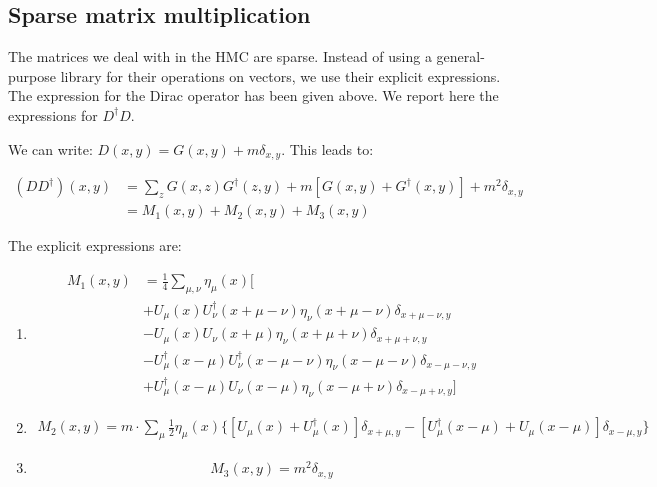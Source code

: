 \documentclass[12pt, a4paper]{article}
\begin{document}
  

\subsection{Sparse matrix multiplication}

The matrices we deal with in the HMC are sparse. 
Instead of using a general-purpose library for their operations on vectors, 
we use their explicit expressions. 
The expression for the Dirac operator has been given above. 
We report here the expressions for $D^{\dagger} D$.

We can write: $D(x,y) = G(x,y) + m \delta_{x,y}$. 
This leads to:

\begin{equation}
\begin{aligned}
(D D^{\dagger}) (x,y) 
&= 
\sum_{z} G(x,z) G^{\dagger}(z,y)
+ m [ G(x,y) + G^{\dagger}(x,y) ]
+ m^2 \delta_{x,y} 
\\
&= M_1(x,y) + M_2(x,y) + M_3(x,y)
\end{aligned}
\end{equation}

The explicit expressions are:

\begin{enumerate}
\item
\begin{equation}
\begin{aligned}
  M_1(x,y)
  &= 
  \frac{1}{4} \sum_{\mu, \nu} \eta_\mu(x)
  [ 
\\
  &+ U_\mu(x) U^{\dagger}_\nu(x+\mu-\nu) 
  \eta_{\nu}(x+\mu-\nu) \delta_{x+\mu-\nu, y}
   \\
  &- U_{\mu}(x) U_{\nu}(x+\mu) 
  \eta_{\nu}(x+\mu+\nu) \delta_{x+\mu+\nu,y}
  \\
  &- U^{\dagger}_{\mu}(x-\mu) U^{\dagger}_{\nu}(x-\mu-\nu) 
  \eta_{\nu}(x-\mu-\nu) \delta_{x-\mu-\nu,y}
   \\
  &+ U^{\dagger}_{\mu}(x-\mu) U_{\nu}(x-\mu) 
  \eta_{\nu}(x-\mu+\nu) \delta_{x-\mu+\nu,y}
  ]
\end{aligned}
\end{equation}

\item
\begin{equation}
\begin{aligned}
    M_2(x,y) 
    = m \cdot \sum_{\mu} \frac{1}{2} \eta_{\mu}(x) 
    \{
      [ U_{\mu}(x) + U_{\mu}^{\dagger}(x) ] 
      \delta_{x+\mu, y} -
      [ U^{\dagger}_{\mu}(x-\mu) + U_{\mu}(x-\mu) ] 
      \delta_{x-\mu, y}
    \}  
\end{aligned}
\end{equation}

\item
\begin{equation}
  M_3(x,y) = m^2 \delta_{x,y}
\end{equation}

\end{enumerate}
\end{document}
